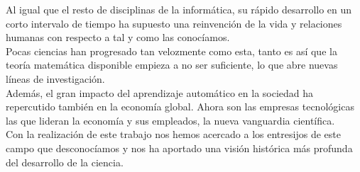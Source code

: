 \documentclass[11pt,twoside,titlepage,a4paper]{article}
\numberwithin{equation}{section} %
\theoremstyle{usual}
\begin{document}
Al igual que el resto de disciplinas de la informática, su rápido desarrollo en un corto intervalo de tiempo ha supuesto una reinvención de la vida y relaciones humanas con respecto a tal y como las conocíamos. \\

Pocas ciencias han progresado tan velozmente como esta, tanto es así que la teoría matemática disponible empieza a no ser suficiente, lo que abre nuevas líneas de investigación. \\

Además, el gran impacto del aprendizaje automático en la sociedad ha repercutido también en la economía global. Ahora son las empresas tecnológicas las que lideran la economía y sus empleados, la nueva vanguardia científica. \\

Con la realización de este trabajo nos hemos acercado a los entresijos de este campo que desconocíamos y nos ha aportado una visión histórica más profunda del desarrollo de la ciencia.

\restoregeometry







\newpage

\printbibliography
\end{document}
